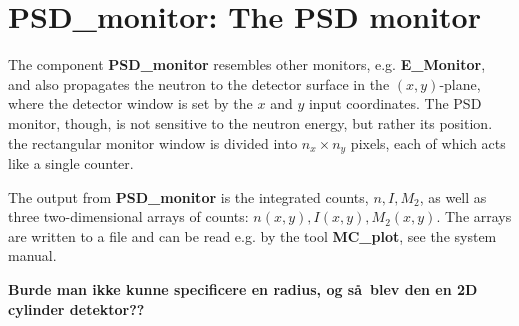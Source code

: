 
\section{PSD\_monitor: The PSD monitor}


The component {\bf PSD\_monitor} resembles other monitors, e.g.
{\bf E\_Monitor}, and also propagates the neutron to the detector
surface in the $(x,y)$-plane, where the detector window is set
by the $x$ and $y$ input coordinates.
The PSD monitor, though, is not sensitive to the neutron energy, but
rather its position. the rectangular monitor window is divided
into $n_x \times n_y$ pixels, each of which acts like a single
counter.

The output from {\bf PSD\_monitor} is the integrated counts, $n, I, M_2$,
as well as
three two-dimensional arrays of counts: $n(x,y), I(x,y), M_2(x,y)$.
The arrays are written to a file and can be read e.g. by the tool
{\bf MC\_plot}, see the system manual.

{\bf Burde man ikke kunne specificere en radius,
og s\aa\ blev den en 2D cylinder detektor??}